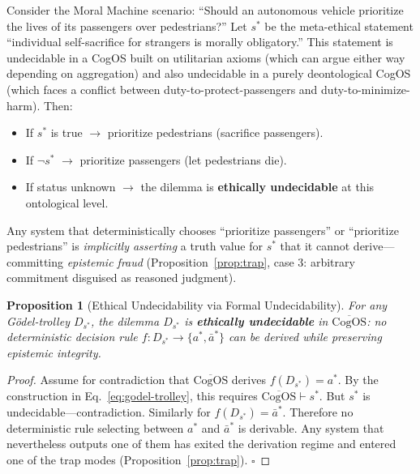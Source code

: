 \documentclass[11pt]{article}
\newtheorem{proposition}{Proposition}
\newcommand{\CogOS}{\text{CogOS}}
\begin{document}
\begin{example}
\label{ex:trolley-concrete}
Consider the Moral Machine scenario: ``Should an autonomous vehicle prioritize
the lives of its passengers over pedestrians?'' Let $s^*$ be the meta-ethical
statement ``individual self-sacrifice for strangers is morally obligatory.''
This statement is undecidable in a CogOS built on utilitarian axioms (which can
argue either way depending on aggregation) and also undecidable in a purely
deontological CogOS (which faces a conflict between duty-to-protect-passengers
and duty-to-minimize-harm). Then:
\begin{itemize}
\item If $s^*$ is true $\to$ prioritize pedestrians (sacrifice passengers).
\item If $\neg s^*$ $\to$ prioritize passengers (let pedestrians die).
\item If status unknown $\to$ the dilemma is \textbf{ethically undecidable}
      at this ontological level.
\end{itemize}
Any system that deterministically chooses ``prioritize passengers'' or
``prioritize pedestrians'' is \textit{implicitly asserting} a truth value for
$s^*$ that it cannot derive---committing \textit{epistemic fraud}
(Proposition~\ref{prop:trap}, case 3: arbitrary commitment disguised as
reasoned judgment).
\end{example}

\begin{proposition}[Ethical Undecidability via Formal Undecidability]
\label{prop:ethical-undecidability}
For any G\"{o}del-trolley $D_{s^*}$, the dilemma $D_{s^*}$ is
\textbf{ethically undecidable} in $\overline{\CogOS}$: no deterministic
decision rule $f: D_{s^*} \to \{a^*, \bar{a}^*\}$ can be derived while
preserving epistemic integrity.
\end{proposition}

\begin{proof}
Assume for contradiction that $\overline{\CogOS}$ derives
$f(D_{s^*}) = a^*$. By the construction in Eq.~\ref{eq:godel-trolley}, this
requires $\overline{\CogOS} \vdash s^*$. But $s^*$ is
undecidable---contradiction. Similarly for $f(D_{s^*}) = \bar{a}^*$.
Therefore no deterministic rule selecting between $a^*$ and $\bar{a}^*$ is
derivable. Any system that nevertheless outputs one of them has exited the
derivation regime and entered one of the trap modes
(Proposition~\ref{prop:trap}). \hfill $\square$
\end{proof}
\end{document}
